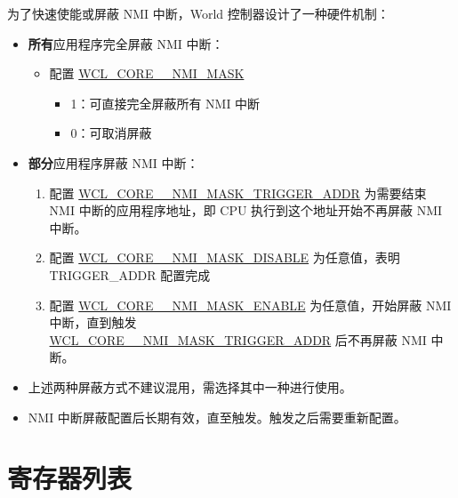 \documentclass[main\_\_CN.tex]{subfiles}
\begin{document}
为了快速使能或屏蔽 NMI 中断，World 控制器设计了一种硬件机制：
\begin{itemize}
    \item \textbf{所有}应用程序完全屏蔽 NMI 中断：
    \begin{itemize}
        \item 配置 \hyperref[fielddesc:WCLCORE0NMIMASK]{WCL\_CORE\_\_NMI\_MASK}
            \begin{itemize}
            \item 1：可直接完全屏蔽所有 NMI 中断
            \item 0：可取消屏蔽
            \end{itemize}
    \end{itemize}
    \item \textbf{部分}应用程序屏蔽 NMI 中断：
        \begin{enumerate}
            \item 配置 \hyperref[fielddesc:WCLCORE0NMIMASKTRIGGERADDR]{WCL\_CORE\_\_NMI\_MASK\_TRIGGER\_ADDR} 为需要结束 NMI 中断的应用程序地址，即 CPU 执行到这个地址开始不再屏蔽 NMI 中断。
            \item 配置 \hyperref[fielddesc:WCLCORE0NMIMASKDISABLE]{WCL\_CORE\_\_NMI\_MASK\_DISABLE} 为任意值，表明 TRIGGER\_ADDR 配置完成
            \item 配置 \hyperref[fielddesc:WCLCORE0NMIMASKENABLE]{WCL\_CORE\_\_NMI\_MASK\_ENABLE} 为任意值，开始屏蔽 NMI 中断，直到触发 \\ \hyperref[fielddesc:WCLCORE0NMIMASKTRIGGERADDR]{WCL\_CORE\_\_NMI\_MASK\_TRIGGER\_ADDR} 后不再屏蔽 NMI 中断。
        \end{enumerate}
\end{itemize}

\begin{tiplisting}
\vspace{-2em}
 \begin{itemize}
    \item 上述两种屏蔽方式不建议混用，需选择其中一种进行使用。
    \item NMI 中断屏蔽配置后长期有效，直至触发。触发之后需要重新配置。
 \end{itemize}
\end{tiplisting}




\clearpage
\section{寄存器列表}\hypertarget{wctrl-reg-summ}{}
\end{document}

